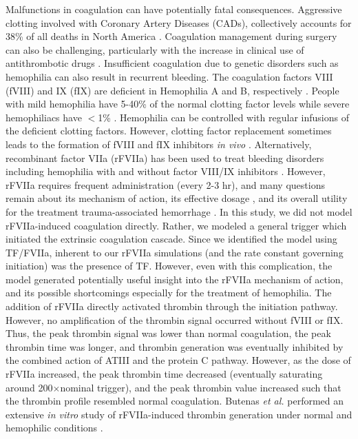 \documentclass[processes,article,received,moreauthors,pdftex,12pt,a4paper]{mdpi}
\begin{document}
Malfunctions in coagulation can have potentially fatal consequences.
Aggressive clotting involved with Coronary Artery Diseases (CADs), collectively accounts for 38\% of all deaths in North America \cite{HANSSON2005}.
Coagulation management during surgery can also be challenging, particularly with the increase in clinical use of antithrombotic drugs \cite{Tanaka:2009wo}.   
Insufficient coagulation due to genetic disorders such as hemophilia can also result in recurrent bleeding. 
The coagulation factors VIII (fVIII) and IX (fIX) are deficient in Hemophilia A and B, respectively \cite{COOPER1994,MANNUCCI2001,MITCHELL2008}.
People with mild hemophilia have 5-40\% of the normal clotting factor levels while severe hemophiliacs have $<$1\% \cite{MITCHELL2008}.
Hemophilia can be controlled with regular infusions of the deficient clotting factors. 
However, clotting factor replacement sometimes leads to the formation of fVIII and fIX inhibitors \emph{in vivo} \cite{TOMOKIYO2003}.
Alternatively, recombinant factor VIIa (rFVIIa) has been used to treat bleeding disorders \cite{Hedner:2008rm,Talbot:2009kk} including
hemophilia with and without factor VIII/IX inhibitors \cite{Shapiro:2008px}.
However, rFVIIa requires frequent administration (every 2-3 hr), and many questions remain about its mechanism of action, 
its effective dosage \cite{TOMOKIYO2003}, and its overall utility for the treatment trauma-associated hemorrhage \cite{Duchesne:2008hw}. 
In this study, we did not model rFVIIa-induced coagulation directly. 
Rather, we modeled a general trigger which initiated the extrinsic coagulation cascade. 
Since we identified the model using TF/FVIIa, inherent to our rFVIIa simulations (and the rate constant governing initiation) 
was the presence of TF. However, even with this complication, 
the model generated potentially useful insight into the rFVIIa mechanism of action, and its possible shortcomings especially for the treatment of hemophilia. 
The addition of rFVIIa directly activated thrombin through the initiation pathway. 
However, no amplification of the thrombin signal occurred without fVIII or fIX. 
Thus, the peak thrombin signal was lower than normal coagulation, the peak thrombin time was longer, and thrombin generation was eventually inhibited by the combined action of ATIII and the protein C pathway.
However, as the dose of rFVIIa increased, the peak thrombin time decreased (eventually saturating around 200$\times$nominal trigger), and the peak thrombin value increased such that
the thrombin profile resembled normal coagulation.
Butenas \emph{et al.} performed an extensive \textit{in vitro} study of rFVIIa-induced thrombin generation under normal and hemophilic conditions \citep{Butenas:2002ab}.
\end{document}
